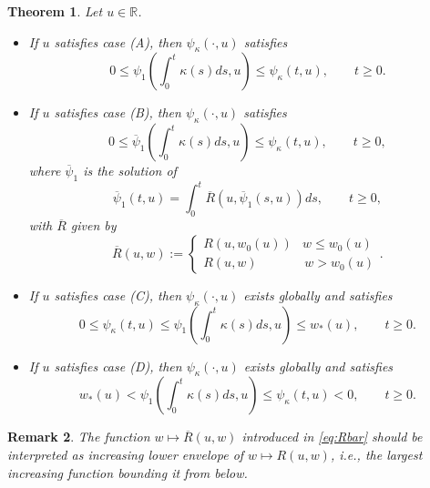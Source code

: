 \documentclass[12pt,a4paper]{amsart}
\numberwithin{equation}{section}
\numberwithin{equation}{section}
\newtheorem{theorem}{Theorem}[section]
\newtheorem{remark}[theorem]{Remark}
\theoremstyle{nonumberplain}
\newcommand{\RR}{\mathbb{R}}
\begin{document}
\begin{theorem}\label{thm:comparison}
	Let $u \in \RR$.
	\begin{itemize}
	\item[(a)] If $u$ satisfies case (A), then $\psi_\kappa(\cdot,u)$ satisfies
	\begin{equation}\label{eq:bound1}
		0 \le \psi_1\left(\int_0^t \kappa(s)ds,u\right) \le \psi_\kappa(t,u), \qquad t \ge 0.
	\end{equation}
	\item[(b)] If $u$ satisfies case (B), then $\psi_\kappa(\cdot,u)$ satisfies
	\begin{equation}
		0 \le \overline \psi_1\left(\int_0^t \kappa(s)ds,u \right) \le \psi_\kappa(t,u), \qquad t \ge 0,
	\end{equation}
	where $\overline \psi_1$ is the solution of
	\begin{equation*}
		\overline \psi_1(t,u) = \int_0^t \overline R \left( u,\overline \psi_1(s,u) \right) ds, \qquad t\ge 0,
	\end{equation*}
	with $\overline R$ given by 
	\begin{equation}\label{eq:Rbar}
	\overline R(u,w) :=  \begin{cases} 
 R(u,w_0(u)) & w \le w_0(u) \\
R(u,w) & \, w > w_0(u)
\end{cases}.
\end{equation}
	\item[(c)] If $u$ satisfies case (C), then $\psi_\kappa(\cdot,u)$ exists globally and satisfies
	\begin{equation}\label{bounds_case_c}
		0 \le \psi_\kappa(t,u) \le \psi_1\left(\int_0^t \kappa(s)ds,u\right) \le w_{*}(u), \qquad t \ge 0.
	\end{equation}
	\item[(d)] If $u$ satisfies case (D), then $\psi_\kappa(\cdot,u)$ exists globally and satisfies
	\begin{equation}
		w_{*}(u) < \psi_1\left(\int_0^t \kappa(s)ds,u \right) \le \psi_\kappa(t,u) < 0, \qquad t \ge 0.
	\end{equation}
	\end{itemize}
\end{theorem}
\begin{remark}The function $w \mapsto \overline R(u,w)$ introduced in \eqref{eq:Rbar} should be interpreted as \emph{increasing lower envelope} of $w \mapsto R(u,w)$, i.e., the largest increasing function bounding it from below.
\end{remark}
\end{document}
